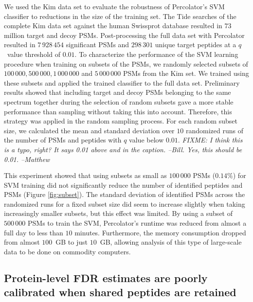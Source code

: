 \documentclass{article}
\begin{document}
We used the Kim data set to evaluate the robustness of Percolator's
SVM classifier to reductions in the size of the training set.  The
Tide searches of the complete Kim data set against the human Swissprot
database resulted in $73$ million target and decoy PSMs.
Post-processing the full data set with Percolator resulted in
$7\,928\,454$ significant PSMs and $298\,301$ unique target peptides
at a $q$~value threshold of $0.01$.  To characterize the performance
of the SVM learning procedure when training on subsets of the PSMs, we
randomly selected subsets of $100\,000, 500\,000, 1\,000\,000$ and
$5\,000\,000$ PSMs from the Kim set.  We trained using these subsets
and applied the trained classifier to the full data set. Preliminary
results showed that including target and decoy PSMs belonging to the
same spectrum together during the selection of random subsets gave a
more stable performance than sampling without taking this into
account. Therefore, this strategy was applied in the random sampling
process. For each random subset size, we calculated the mean and
standard deviation over $10$ randomized runs of the number of PSMs and
peptides with $q$ value below $0.01$. {\em FIXME: I think this is a
  typo, right? It says 0.01 above and in the caption. --Bill. Yes, 
this should be 0.01. --Matthew}

This experiment showed that using subsets as small as $100\,000$ PSMs
($0.14\%$) for SVM training did not significantly reduce the number of
identified peptides and PSMs (Figure \ref{fig:subset}). The standard
deviation of identified PSMs across the randomized runs for a fixed
subset size did seem to increase slightly when taking increasingly
smaller subsets, but this effect was limited. By using a subset of
$500\,000$ PSMs to train the SVM, Percolator's runtime was reduced
from almost a full day to less than $10$ minutes. Furthermore, the
memory consumption dropped from almost $100$~GB to just $10$~GB,
allowing analysis of this type of large-scale data to be done on
commodity computers.

\subsection*{Protein-level FDR estimates are poorly calibrated when
  shared peptides are retained}
\end{document}
